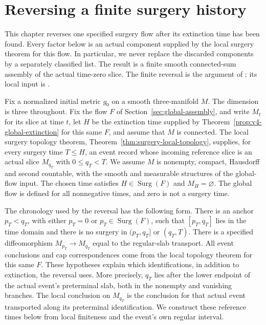 \chapter{Reversing a finite surgery history}
\label{ch:finite-history-v4}

This chapter reverses one specified surgery flow after its extinction time has
been found.  Every factor below is an actual component supplied by the local
surgery theorem for this flow.  In particular, we never replace the discarded
components by a separately classified list.  The result is a finite smooth
connected-sum assembly of the actual time-zero slice.  The finite reversal is
the argument of \cite[Corollary 15.4, pp.~358--359]{MT2007}; its local input is
\cite[Proposition 15.3, pp.~357--358]{MT2007}.

Fix a normalized initial metric $g_0$ on a smooth three-manifold $M$.  The
dimension is three throughout. Fix the flow $F$ of
Section~\ref{sec:global-assembly}, and write $M_t$
for its slice at time $t$,
let $H$ be the extinction time supplied
by Theorem~\ref{prop:v4-global-extinction} for this same $F$, and assume
that $M$ is connected. The local surgery topology theorem,
Theorem~\ref{thm:surgery-local-topology}, supplies, for every surgery time
$T\leq H$, an event record whose incoming reference slice is an actual slice
$M_{q_T}$ with $0\leq q_T<T$.  We assume $M$ is nonempty, compact,
Hausdorff and second countable, with the smooth and measurable structures of
the global-flow input.  The chosen time satisfies
$H\in\operatorname{Surg}(F)$ and $M_H=\varnothing$.
The global flow is defined for all nonnegative times, and zero is not a
surgery time.

The chronology used by the reversal has the following form.  There is an
anchor $p_T<q_T$, with either $p_T=0$ or
$p_T\in\operatorname{Surg}(F)$, such that $[p_T,q_T]$ lies in the time
domain and there is no surgery in $(p_T,q_T]$ or $(q_T,T)$.
There is a specified diffeomorphism $M_{p_T}\to M_{q_T}$ equal to the
regular-slab transport.  All event conclusions and cap correspondences come
from the local topology theorem for this same $F$.  These hypotheses explain
which identifications, in addition to extinction, the reversal uses.
More precisely, $q_T$ lies after the lower endpoint of the actual event's
preterminal slab, both in the nonempty and vanishing branches.  The local
conclusion on $M_{q_T}$ is the conclusion for that actual event transported
along its preterminal identification.
We construct these reference times below from local finiteness and the
event's own regular interval.

